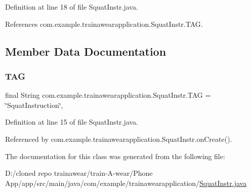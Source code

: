 Definition at line 18 of file Squat\+Instr.\+java.


\begin{DoxyCode}{0}

\end{DoxyCode}


References com.\+example.\+trainawearapplication.\+Squat\+Instr.\+T\+AG.



\subsection{Member Data Documentation}
\mbox{\label{classcom_1_1example_1_1trainawearapplication_1_1_squat_instr_ad7fe74204afe9fb8319e762c400a9d9d}} 
\subsubsection{\texorpdfstring{TAG}{TAG}}
{\footnotesize\ttfamily final String com.\+example.\+trainawearapplication.\+Squat\+Instr.\+T\+AG = \char`\"{}Squat\+Instruction\char`\"{}\hspace{0.3cm}{\ttfamily [static]}, {\ttfamily [private]}}



Definition at line 15 of file Squat\+Instr.\+java.



Referenced by com.\+example.\+trainawearapplication.\+Squat\+Instr.\+on\+Create().



The documentation for this class was generated from the following file\+:\begin{DoxyCompactItemize}
\item 
D\+:/cloned repo trainawear/train-\/\+A-\/wear/\+Phone App/app/src/main/java/com/example/trainawearapplication/\mbox{\hyperlink{_squat_instr_8java}{Squat\+Instr.\+java}}\end{DoxyCompactItemize}
